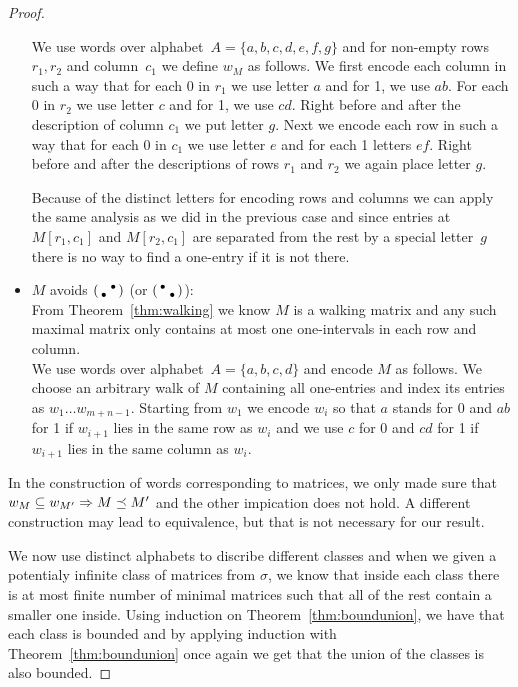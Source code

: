 \begin{proof}
\begin{itemize}
		We use words over alphabet~$A=\{a,b,c,d,e,f,g\}$ and for non-empty rows~$r_1,r_2$ and column~$c_1$ we define $w_M$ as follows. We first encode each column in such a way that for each 0 in $r_1$ we use letter $a$ and for 1, we use $ab$. For each 0 in $r_2$ we use letter $c$ and for 1, we use $cd$. Right before and after the description of column $c_1$ we put letter $g$. Next we encode each row in such a way that for each 0 in $c_1$ we use letter $e$ and for each 1 letters $ef$. Right before and after the descriptions of rows $r_1$ and $r_2$ we again place letter $g$.
		
		Because of the distinct letters for encoding rows and columns we can apply the same analysis as we did in the previous case and since entries at $M[r_1,c_1]$ and $M[r_2,c_1]$ are separated from the rest by a special letter~$g$ there is no way to find a one-entry if it is not there.
	\item $M$ avoids $\left(\begin{smallmatrix} &\bullet\\\bullet& \end{smallmatrix}\right)$ (or $\left(\begin{smallmatrix}\bullet& \\ &\bullet\end{smallmatrix}\right)$):\\
		From Theorem~\ref{thm:walking} we know $M$ is a walking matrix and any such maximal matrix only contains at most one one-intervals in each row and column.\\
		
		We use words over alphabet~$A=\{a,b,c,d\}$ and encode $M$ as follows. We choose an arbitrary walk of $M$ containing all one-entries and index its entries as $w_1\dots w_{m+n-1}$. Starting from $w_1$ we encode $w_i$ so that $a$ stands for 0 and $ab$ for 1 if $w_{i+1}$ lies in the same row as $w_i$ and we use $c$ for 0 and $cd$ for 1 if $w_{i+1}$ lies in the same column as $w_i$.
\end{itemize}

In the construction of words corresponding to matrices, we only made sure that $w_M\subseteq w_{M'}\Rightarrow M\preceq M'$ and the other impication does not hold. A different construction may lead to equivalence, but that is not necessary for our result.

We now use distinct alphabets to discribe different classes and when we given a potentialy infinite class of matrices from $\sigma$, we know that inside each class there is at most finite number of minimal matrices such that all of the rest contain a smaller one inside. Using induction on Theorem~\ref{thm:boundunion}, we have that each class is bounded and by applying induction with Theorem~\ref{thm:boundunion} once again we get that the union of the classes is also bounded.
\end{proof}

